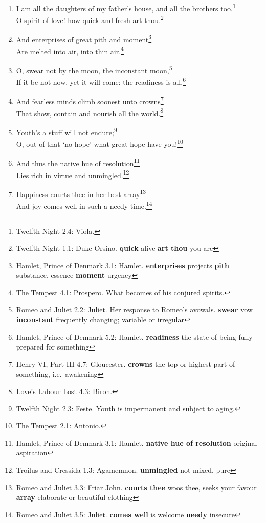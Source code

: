 \documentclass[17pt,twoside]{extarticle}
\begin{document}
\begin{enumerate}
\item
  I am all the daughters of my father's house, and all the brothers
  too.\footnote{Twelfth Night 2.4: Viola.}\\O spirit of love! how quick
  and fresh art thou.\footnote{Twelfth Night 1.1: Duke Orsino.
    \textbf{quick} alive \textbf{art thou} you are}
\item
  And enterprises of great pith and moment\footnote{Hamlet, Prince of
    Denmark 3.1: Hamlet. \textbf{enterprises} projects \textbf{pith}
    substance, essence \textbf{moment} urgency}\\Are melted into air,
  into thin air.\footnote{The Tempest 4.1: Prospero. What becomes of his
    conjured spirits.}
\item
  O, swear not by the moon, the inconstant moon,\footnote{Romeo and
    Juliet 2.2: Juliet. Her response to Romeo's avowals. \textbf{swear}
    vow \textbf{inconstant} frequently changing; variable or irregular}\\If
  it be not now, yet it will come: the readiness is all.\footnote{Hamlet,
    Prince of Denmark 5.2: Hamlet. \textbf{readiness} the state of being
    fully prepared for something}
\item
  And fearless minds climb soonest unto crowns\footnote{Henry VI, Part
    III 4.7: Gloucester. \textbf{crowns} the top or highest part of
    something, i.e.~awakening}\\That show, contain and nourish all the
  world.\footnote{Love's Labour Lost 4.3: Biron.}
\item
  Youth's a stuff will not endure;\footnote{Twelfth Night 2.3: Feste.
    Youth is impermanent and subject to aging.}\\O, out of that `no
  hope' what great hope have you!\footnote{The Tempest 2.1: Antonio.}
\item
  And thus the native hue of resolution\footnote{Hamlet, Prince of
    Denmark 3.1: Hamlet. \textbf{native hue of resolution} original
    aspiration}\\Lies rich in virtue and unmingled.\footnote{Troilus and
    Cressida 1.3: Agamemnon. \textbf{unmingled} not mixed, pure}
\item
  Happiness courts thee in her best array\footnote{Romeo and Juliet 3.3:
    Friar John. \textbf{courts thee} woos thee, seeks your favour
    \textbf{array} elaborate or beautiful clothing}\\And joy comes well
  in such a needy time.\footnote{Romeo and Juliet 3.5: Juliet.
    \textbf{comes well} is welcome \textbf{needy} insecure}

\end{enumerate}
\end{document}
